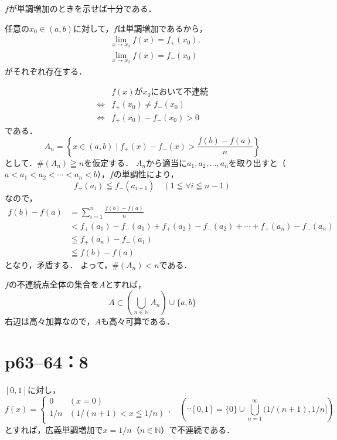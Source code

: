 \begin{tproof} $f$が単調増加のときを示せば十分である．

    任意の$ x_0 \in (a,b)$に対して，$f$は単調増加であるから，
    \begin{align*}
         & \lim_{x \to x_0} f(x)=f_{+} (x_0) , \\
         & \lim_{x \to x_0} f(x)=f_{-} (x_0)
    \end{align*}
    がそれぞれ存在する．

    \begin{align*}
             & \text{$f(x)$が$x_0$において不連続}  \\
        \iff & f_{+} (x_0) \ne f_{-} (x_0) \\
        \iff & f_{+} (x_0) - f_{-} (x_0)>0
    \end{align*}
    である．
    \[
        A_n =  \left \{ x \in (a,b) \mid f_{+} (x) - f_{-} (x) > \frac{f(b)-f(a)}{n} \right \}
    \]
    として．$\# (A_n) \geqq n$を仮定する．
    $A_n$から適当に$a_1,a_2,\ldots,a_n$を取り出すと（$a<a_1 < a_2 < \cdots < a_n<b$），$f$の単調性により，
    \[
        f_{+} (a_i) \leqq f_{-} (a_{i+1}) \quad (1 \leqq \forall i \leqq n-1)
    \]
    なので，
    \begin{align*}
        f(b)-f(a) & = \sum_{i=1}^{n} \frac{f(b)-f(a)}{n}                                                         \\
                  & < f_{+} (a_1) - f_{-} (a_1) + f_{+} (a_2) - f_{-} (a_2) + \cdots + f_{+} (a_n) - f_{-} (a_n) \\
                  & \leqq f_{+} (a_n) - f_{-} (a_1)                                                              \\
                  & \leqq f(b)-f(a)
    \end{align*}
    となり，矛盾する．
    よって，$\# (A_n) < n$である．

    $f$の不連続点全体の集合を$A$とすれば，
    \[
        A \subset \left ( \bigcup_{n \in \mathbb{N}}  A_n \right ) \cup \{ a, b \}
    \]
    右辺は高々加算なので，$A$も高々可算である．
\end{tproof}

\section*{p63--64：8}
\begin{tanswer}
    $ [0,1]$に対し，
    \[
        f(x)= \begin{cases}
            0   & (x=0)                   \\
            1/n & (1/(n+1) < x \leqq 1/n) \\
        \end{cases}
        ,\quad \left ( \because [0,1] = \{ 0 \} \cup \bigcup_{n=1}^{\infty} (1/(n+1),1/n] \right )
    \]
    とすれば，広義単調増加で$x=1/n$（$n \in \mathbb{N}$）で不連続である．
\end{tanswer}


